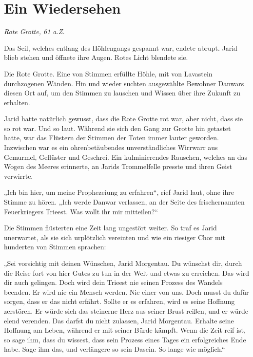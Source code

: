 \newpage
\section{Ein Wiedersehen}




\textit{Rote Grotte, 61 a.Z.}\bigskip




Das Seil, welches entlang des Höhlengangs gespannt war, endete abrupt. Jarid blieb stehen und öffnete ihre Augen. Rotes Licht blendete sie.

Die Rote Grotte. Eine von Stimmen erfüllte Höhle, mit von Lavastein durchzogenen Wänden. Hin und wieder suchten ausgewählte Bewohner Danwars diesen Ort auf, um den Stimmen zu lauschen und Wissen über ihre Zukunft zu erhalten.

Jarid hatte natürlich gewusst, dass die Rote Grotte rot war, aber nicht, dass sie so rot war. Und so laut. Während sie sich den Gang zur Grotte hin getastet hatte, war das Flüstern der Stimmen der Toten immer lauter geworden. Inzwischen war es ein ohrenbetäubendes unverständliches Wirrwarr aus Gemurmel, Geflüster und Geschrei. Ein kulminierendes Rauschen, welches an das Wogen des Meeres erinnerte, an Jarids Trommelfelle presste und ihren Geist verwirrte.

„Ich bin hier, um meine Prophezeiung zu erfahren“, rief Jarid laut, ohne ihre Stimme zu hören. „Ich werde Danwar verlassen, an der Seite des frischernannten Feuerkriegers Trieest. Was wollt ihr mir mitteilen?“

Die Stimmen flüsterten eine Zeit lang ungestört weiter. So traf es Jarid unerwartet, als sie sich urplötzlich vereinten und wie ein riesiger Chor mit hunderten von Stimmen sprachen:

„Sei vorsichtig mit deinen Wünschen, Jarid Morgentau. Du wünschst dir, durch die Reise fort von hier Gutes zu tun in der Welt und etwas zu erreichen. Das wird dir auch gelingen. Doch wird dein Trieest nie seinen Prozess des Wandels beenden. Er wird nie ein Mensch werden. Nie einer von uns. Doch musst du dafür sorgen, dass er das nicht erfährt. Sollte er es erfahren, wird es seine Hoffnung zerstören. Er würde sich das steinerne Herz aus seiner Brust reißen, und er würde elend verenden. Das darfst du nicht zulassen, Jarid Morgentau. Erhalte seine Hoffnung am Leben, während er mit seiner Bürde kämpft. Wenn die Zeit reif ist, so sage ihm, dass du wissest, dass sein Prozess eines Tages ein erfolgreiches Ende habe. Sage ihm das, und verlängere so sein Dasein. So lange wie möglich.“

